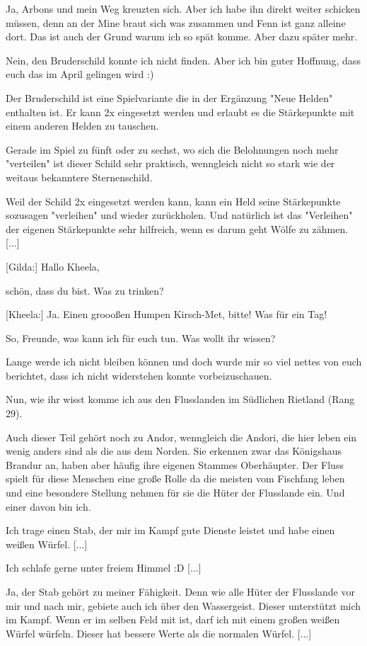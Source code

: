 \documentclass[10pt, a4paper, oneside]{book}
\begin{document}
\begin{multicols}{2}
Ja, Arbons und mein Weg kreuzten sich. Aber ich habe ihn direkt weiter schicken müssen, denn an der Mine braut sich was zusammen und Fenn ist ganz alleine dort. Das ist auch der Grund warum ich so spät komme. Aber dazu später mehr.

Nein, den Bruderschild konnte ich nicht finden. Aber ich bin guter Hoffnung, dass euch das im April gelingen wird :)

Der Bruderschild ist eine Spielvariante die in der Ergänzung "Neue Helden" enthalten ist. Er kann 2x eingesetzt werden und erlaubt es die Stärkepunkte mit einem anderen Helden zu tauschen.

Gerade im Spiel zu fünft oder zu sechst, wo sich die Belohnungen noch mehr "verteilen" ist dieser Schild sehr praktisch, wenngleich nicht so stark wie der weitaus bekanntere Sternenschild.

Weil der Schild 2x eingesetzt werden kann, kann ein Held seine Stärkepunkte sozusagen "verleihen" und wieder zurückholen. Und natürlich ist das "Verleihen" der eigenen Stärkepunkte sehr hilfreich, wenn es darum geht Wölfe zu zähmen. [...]

[Gilda:] Hallo Kheela,

schön, dass du bist. Was zu trinken?

[Kheela:] Ja. Einen groooßen Humpen Kirsch-Met, bitte! Was für ein Tag!

So, Freunde, was kann ich für euch tun. Was wollt ihr wissen?

Lange werde ich nicht bleiben können und doch wurde mir so viel nettes von euch berichtet, dass ich nicht widerstehen konnte vorbeizuschauen.

Nun, wie ihr wisst komme ich aus den Flusslanden im Südlichen Rietland (Rang 29).

Auch dieser Teil gehört noch zu Andor, wenngleich die Andori, die hier leben ein wenig anders sind als die aus dem Norden. Sie erkennen zwar das Königshaus Brandur an, haben aber häufig ihre eigenen Stammes Oberhäupter. Der Fluss spielt für diese Menschen eine große Rolle da die meisten vom Fischfang leben und eine besondere Stellung nehmen für sie die Hüter der Flusslande ein. Und einer davon bin ich.

Ich trage einen Stab, der mir im Kampf gute Dienste leistet und habe einen weißen Würfel. [...]

Ich schlafe gerne unter freiem Himmel :D [...]

Ja, der Stab gehört zu meiner Fähigkeit. Denn wie alle Hüter der Flusslande vor mir und nach mir, gebiete auch ich über den Wassergeist. Dieser unterstützt mich im Kampf. Wenn er im selben Feld mit ist, darf ich mit einem großen weißen Würfel würfeln. Dieser hat bessere Werte als die normalen Würfel. [...]


\end{multicols}
\end{document}

